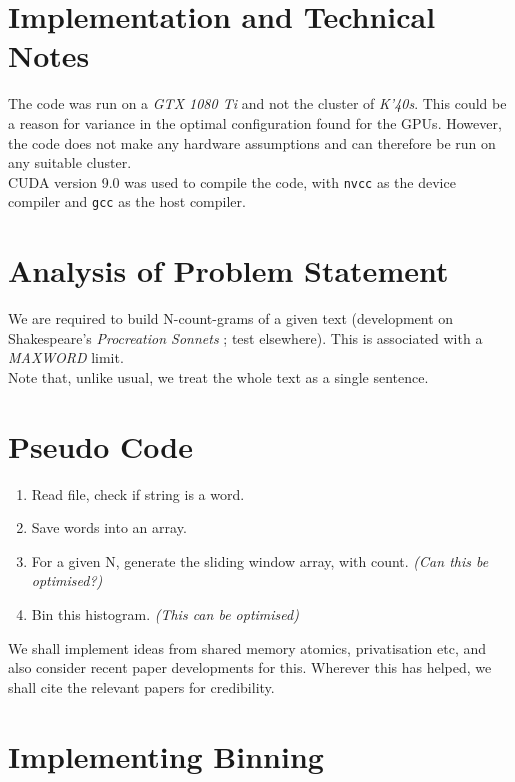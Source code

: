 \section {Implementation and Technical Notes}

The code was run on a \textit{GTX 1080 Ti} and not the cluster of \textit{K'40s}. This could be a reason for variance in the optimal configuration found for the GPUs. However, the code does not make any hardware assumptions and can therefore be run on any suitable cluster. \\

CUDA version 9.0 was used to compile the code, with \lstinline{nvcc} as the device compiler and \lstinline{gcc} as the host compiler.

\section{Analysis of Problem Statement}

We are required to build N-count-grams of a given text (development on Shakespeare's \textit{Procreation Sonnets} ; test elsewhere). This is associated with a \textit{MAXWORD} limit. \\

Note that, unlike usual, we treat the whole text as a single sentence. 

\section{Pseudo Code}

\begin{enumerate}
\item  Read file, check if string is a word.
\item  Save words into an array.
\item For a given N, generate the sliding window array, with count. \textit{(Can this be optimised?)}
\item  Bin this histogram. \textit{(This can be optimised)}
\end{enumerate}

We shall implement ideas from shared memory atomics, privatisation etc, and also consider recent paper developments for this. Wherever this has helped, we shall cite the relevant papers for credibility.

\section{Implementing Binning}

